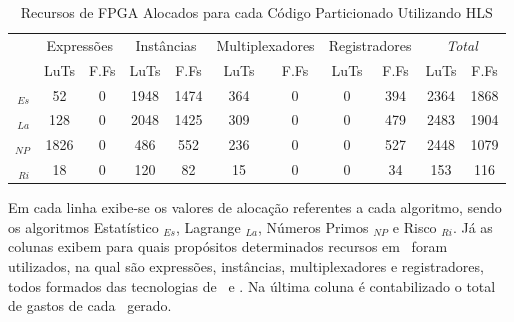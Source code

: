         \begin{table}[h]\centering
            \vspace{-1em}
            \caption{Recursos de FPGA Alocados para cada Código Particionado Utilizando HLS}
            \begin{tabular}{rcc|cc|cc|cc|cc}
                \toprule
                &\multicolumn{2}{c}{Expressões} & \multicolumn{2}{c}{Instâncias}      & \multicolumn{2}{c}{Multiplexadores}  & \multicolumn{2}{c}{Registradores} & \multicolumn{2}{c}{\textit{Total}} \\
                \cmidrule{2-11}
                & LuTs & F.Fs & LuTs & F.Fs & LuTs & F.Fs & LuTs & F.Fs & LuTs & F.Fs \\
                \midrule
                \A$_{Es}$&52 & 0     & 1948 & 1474   & 364 & 0      & 0 & 394   & 2364 & 1868 \\ 
                \A$_{La}$&128 & 0    & 2048 & 1425   & 309 & 0      & 0 & 479   & 2483 & 1904 \\ 
                \A$_{NP}$&1826 & 0   & 486 & 552     & 236 & 0      & 0 & 527   & 2448 & 1079 \\ 
                \A$_{Ri}$&18 & 0     & 120  & 82     & 15  & 0      & 0 & 34    & 153  & 116  \\ 
                \bottomrule
            \end{tabular}
            \label{tab:hls}
        \end{table}
        
        
        Em cada linha exibe-se os valores de alocação referentes a cada algoritmo, sendo os algoritmos Estatístico \A$_{Es}$, Lagrange \A$_{La}$, Números Primos \A$_{NP}$ e Risco \A$_{Ri}$.
        Já as colunas exibem para quais propósitos determinados recursos em \hardware\ foram utilizados, na qual são expressões, instâncias, multiplexadores e registradores, todos formados das tecnologias de \luts\ e \ffs.       
        Na última coluna é contabilizado o total de gastos de cada \hardware\ gerado.
        
